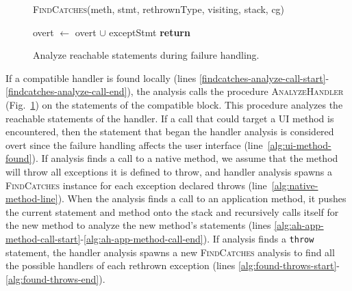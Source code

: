 \begin{figure}[t]
\begin{algorithmic}[1]
\EndFor \label{alg:calc-rethrow-types-end}

\label{alg:findcatches-rethrown-line}
\State \textsc{FindCatches}(meth, stmt, rethrownType, visiting, stack,
cg)

\label{alg:progagate-line}
\State overt $\gets$ overt $\cup$ exceptStmt
\State \textbf{return}
\EndIf
\EndFor
\label{alg:found-throws-end}
\EndIf

\EndFor

\EndProcedure
\end{algorithmic}
\caption{Analyze reachable statements during failure handling.}\label{alg:analyzehandler}
\vspace{-0.1in}
\end{figure}

If a compatible handler is found locally (lines
\ref{findcatches-analyze-call-start}-\ref{findcatches-analyze-call-end}),
the analysis calls the procedure \textsc{AnalyzeHandler}
(Fig.~\ref{alg:analyzehandler}) on the statements of the compatible
block.  This procedure analyzes the reachable statements of the
handler. If a call that could target a UI method is encountered, then
the statement that began the handler analysis is considered overt
since the failure handling affects the user interface
(line~\ref{alg:ui-method-found}).  If analysis finds a call to a
native method, we assume that the method will throw all exceptions it
is defined to throw, and handler analysis spawns a
\textsc{FindCatches} instance for each exception declared throws
(line~\ref{alg:native-method-line}). When the analysis finds a call to
an application method, it pushes the current statement and method onto
the stack and recursively calls itself for the new method to analyze
the new method's statements (lines
\ref{alg:ah-app-method-call-start}-\ref{alg:ah-app-method-call-end}).
If analysis finds a \lstinline!throw!  statement, the handler analysis
spawns a new \textsc{FindCatches} analysis to find all the possible
handlers of each rethrown exception (lines
\ref{alg:found-throws-start}-\ref{alg:found-throws-end}).



